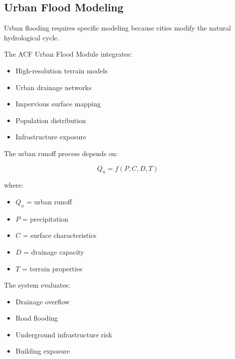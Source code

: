 \subsection{Urban Flood Modeling}

Urban flooding requires specific modeling because cities modify the
natural hydrological cycle.

The ACF Urban Flood Module integrates:

\begin{itemize}

\item High-resolution terrain models

\item Urban drainage networks

\item Impervious surface mapping

\item Population distribution

\item Infrastructure exposure

\end{itemize}


The urban runoff process depends on:

\[
Q_u=f(P,C,D,T)
\]

where:

\begin{itemize}

\item $Q_u$ = urban runoff

\item $P$ = precipitation

\item $C$ = surface characteristics

\item $D$ = drainage capacity

\item $T$ = terrain properties

\end{itemize}


The system evaluates:

\begin{itemize}

\item Drainage overflow

\item Road flooding

\item Underground infrastructure risk

\item Building exposure

\end{itemize}


